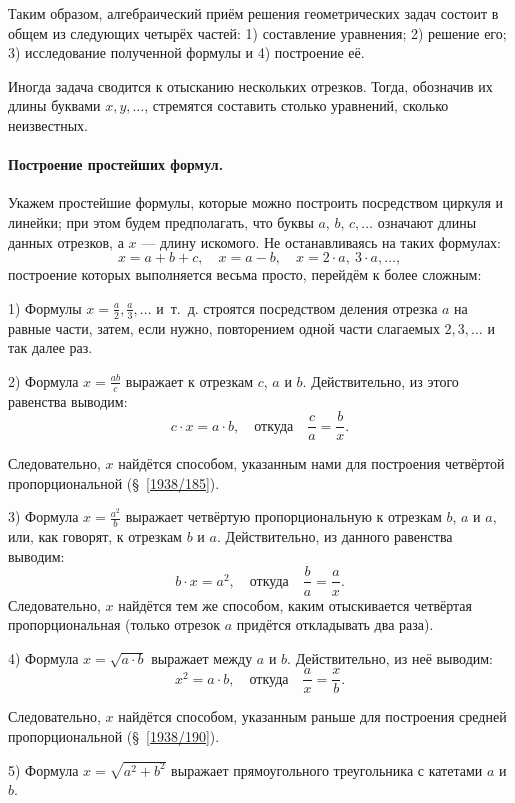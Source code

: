 {Таким образом, алгебраический приём решения геометрических задач состоит в общем из следующих четырёх частей:
1) составление уравнения;
2) решение его;
3) исследование полученной формулы и 4) построение её.

Иногда задача сводится к отысканию нескольких отрезков.
Тогда, обозначив их длины буквами $x,y,\dots$, стремятся составить столько уравнений, сколько неизвестных.

\paragraph{Построение простейших формул.}\label{1938/211}
Укажем простейшие формулы, которые можно построить посредством циркуля и линейки;
при этом будем предполагать, что буквы $a$, $b$, $c,\dots$
означают длины данных отрезков, а $x$ — длину искомого.
Не останавливаясь на таких формулах:
\[x=a+b+c,
 \quad
 x=a-b,
 \quad
 x=2\cdot a,\ 3\cdot a,\dots,
\]
построение которых выполняется весьма просто, перейдём к более сложным:


1) Формулы $x=\frac a2, \frac a3,\dots$ и~т.~д. строятся посредством деления отрезка $a$ на равные части, затем, если нужно, повторением одной части слагаемых $2, 3,\dots$ и так далее раз.

2) Формула $x=\frac{ab}c$ выражает  к отрезкам $c$, $a$ и $b$.
Действительно, из этого равенства выводим:
\[c\cdot x=a\cdot b,
\quad\text{откуда}\quad
\frac ca=\frac bx.\]

Следовательно, $x$ найдётся способом, указанным нами для построения четвёртой пропорциональной (§~\ref{1938/185}).

3) Формула $x=\frac{a^2}b$ выражает четвёртую пропорциональную к отрезкам $b$, $a$ и $a$, или, как говорят,  к отрезкам $b$ и $a$.
Действительно, из данного равенства выводим:
\[b\cdot x=a^2,
\quad\text{откуда}\quad
\frac ba=\frac ax.\]
Следовательно, $x$ найдётся тем же способом, каким отыскивается четвёртая пропорциональная (только отрезок $a$ придётся откладывать два раза).

4) Формула $x=\sqrt{a\cdot b}$ выражает  между $a$ и $b$.
Действительно, из неё выводим:
\[x^2=a\cdot b,
\quad\text{откуда}\quad\frac ax=\frac xb.\]

Следовательно, $x$ найдётся способом, указанным раньше для построения средней пропорциональной (§~\ref{1938/190}).

5) Формула $x=\sqrt{a^2+b^2}$ выражает  прямоугольного треугольника с катетами $a$ и $b$.


}
